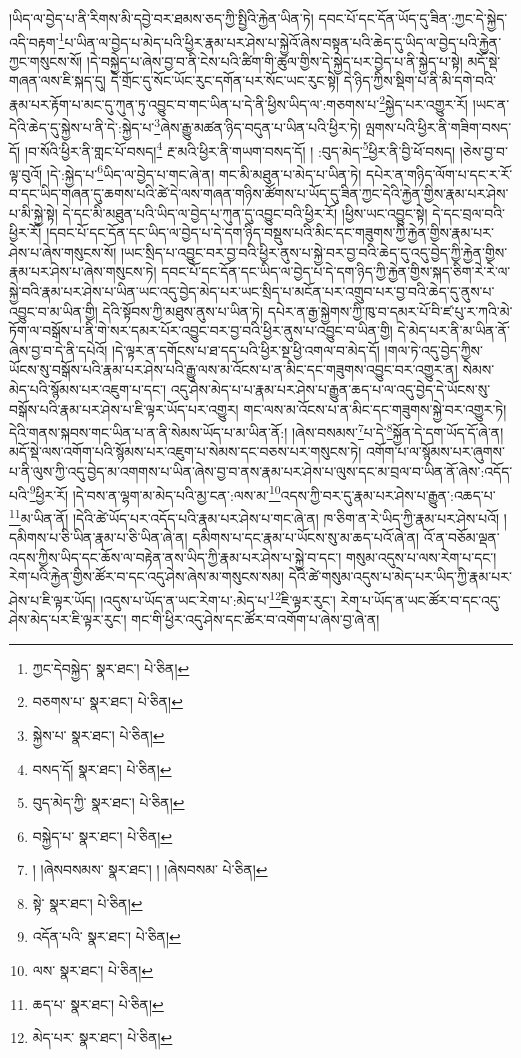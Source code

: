 །ཡིད་ལ་བྱེད་པ་ནི་རིགས་མི་དབྱེ་བར་ཐམས་ཅད་ཀྱི་སྤྱིའི་རྐྱེན་ཡིན་ཏེ། དབང་པོ་དང་དོན་ཡོད་དུ་ཟིན་:ཀྱང་དེ་སྐྱེད་འདི་བརྟག་\footnote{ཀྱང་དེབསྐྱེད་  སྣར་ཐང་།  པེ་ཅིན། }པ་ཡིན་ལ་བྱེད་པ་མེད་པའི་ཕྱིར་རྣམ་པར་ཤེས་པ་སྐྱེའོ་ཞེས་བསྟན་པའི་ཆེད་དུ་ཡིད་ལ་བྱེད་པའི་རྐྱེན་ཀྱང་གསུངས་སོ། །དེ་བསྐྱེད་པ་ཞེས་བྱ་བ་ནི་ངེས་པའི་ཚིག་གི་ཚུལ་གྱིས་དེ་སྐྱེད་པར་བྱེད་པ་ནི་སྐྱེད་པ་སྟེ། མདོ་སྡེ་གཞན་ལས་ཇི་སྐད་དུ། དེ་གྲོང་དུ་སོང་ཡོང་རུང་དགོན་པར་སོང་ཡང་རུང་སྟེ། དེ་ཉིད་ཀྱིས་སྡིག་པ་ནི་མི་དགེ་བའི་རྣམ་པར་རྟོག་པ་མང་དུ་ཀུན་ཏུ་འབྱུང་བ་གང་ཡིན་པ་དེ་ནི་ཕྱིས་ཡིད་ལ་:གཅགས་པ་\footnote{བཅགས་པ་  སྣར་ཐང་།  པེ་ཅིན། }སྐྱེད་པར་འགྱུར་རོ། །ཡང་ན་དེའི་ཆེད་དུ་སྐྱེས་པ་ནི་དེ་:སྐྱེད་པ་\footnote{སྐྱེས་པ་  སྣར་ཐང་།  པེ་ཅིན། }ཞེས་རྒྱུ་མཚན་ཉིད་བདུན་པ་ཡིན་པའི་ཕྱིར་ཏེ། ལྤགས་པའི་ཕྱིར་ནི་གཟིག་བསད་དོ། །བ་སོའི་ཕྱིར་ནི་གླང་པོ་བསད།\footnote{བསད་དོ།  སྣར་ཐང་།  པེ་ཅིན། } རྔ་མའི་ཕྱིར་ནི་གཡག་བསད་དོ། །
:བུད་མེད་\footnote{བུད་མེད་ཀྱི་  སྣར་ཐང་།  པེ་ཅིན། }ཕྱིར་ནི་བྱི་ཕོ་བསད། །ཅེས་བྱ་བ་ལྟ་བུའོ། །དེ་:སྐྱེད་པ་\footnote{བསྐྱེད་པ་  སྣར་ཐང་།  པེ་ཅིན། }ཡིད་ལ་བྱེད་པ་གང་ཞེ་ན། གང་མི་མཐུན་པ་མེད་པ་ཡིན་ཏེ། དཔེར་ན་གཉིད་ལོག་པ་དང་ར་རོ་བ་དང་ཡིད་གཞན་དུ་ཆགས་པའི་ཚེ་དེ་ལས་གཞན་གཉིས་ཚོགས་པ་ཡོད་དུ་ཟིན་ཀྱང་དེའི་རྐྱེན་གྱིས་རྣམ་པར་ཤེས་པ་མི་སྐྱེ་སྟེ། དེ་དང་མི་མཐུན་པའི་ཡིད་ལ་བྱེད་པ་ཀུན་དུ་འབྱུང་བའི་ཕྱིར་རོ། །ཕྱིས་ཡང་འབྱུང་སྟེ། དེ་དང་བྲལ་བའི་ཕྱིར་རོ། །དབང་པོ་དང་དོན་དང་ཡིད་ལ་བྱེད་པ་དེ་དག་ཉིད་བསྡུས་པའི་མིང་དང་གཟུགས་ཀྱི་རྐྱེན་གྱིས་རྣམ་པར་ཤེས་པ་ཞེས་གསུངས་སོ། །ཡང་སྲིད་པ་འབྱུང་བར་བྱ་བའི་ཕྱིར་ནུས་པ་སྐྱེ་བར་བྱ་བའི་ཆེད་དུ་འདུ་བྱེད་ཀྱི་རྐྱེན་གྱིས་རྣམ་པར་ཤེས་པ་ཞེས་གསུངས་ཏེ། དབང་པོ་དང་དོན་དང་ཡིད་ལ་བྱེད་པ་དེ་དག་ཉིད་ཀྱི་རྐྱེན་གྱིས་སྐད་ཅིག་རེ་རེ་ལ་སྐྱེ་བའི་རྣམ་པར་ཤེས་པ་ཡིན་ཡང་འདུ་བྱེད་མེད་པར་ཡང་སྲིད་པ་མངོན་པར་འགྲུབ་པར་བྱ་བའི་ཆེད་དུ་ནུས་པ་འབྱུང་བ་མ་ཡིན་གྱི། དེའི་སྟོབས་ཀྱི་མཐུས་ནུས་པ་ཡིན་ཏེ། དཔེར་ན་རྒྱ་སྐྱེགས་ཀྱི་ཁུ་བ་དམར་པོ་བི་ཛ་པུ་ར་ཀའི་མེ་ཏོག་ལ་བསྒོས་པ་ནི་གེ་སར་དམར་པོར་འབྱུང་བར་བྱ་བའི་ཕྱིར་ནུས་པ་འབྱུང་བ་ཡིན་གྱི། དེ་མེད་པར་ནི་མ་ཡིན་ནོ་ཞེས་བྱ་བ་དེ་ནི་དཔེའོ། །དེ་ལྟར་ན་དགོངས་པ་ཐ་དད་པའི་ཕྱིར་སྔ་ཕྱི་འགལ་བ་མེད་དོ། །གལ་ཏེ་འདུ་བྱེད་ཀྱིས་ཡོངས་སུ་བསྒོས་པའི་རྣམ་པར་ཤེས་པའི་རྒྱུ་ལས་མ་འོངས་པ་ན་མིང་དང་གཟུགས་འབྱུང་བར་འགྱུར་ན། སེམས་མེད་པའི་སྙོམས་པར་འཇུག་པ་དང་། འདུ་ཤེས་མེད་པ་པ་རྣམ་པར་ཤེས་པ་རྒྱུན་ཆད་པ་ལ་འདུ་བྱེད་དེ་ཡོངས་སུ་བསྒོས་པའི་རྣམ་པར་ཤེས་པ་ཇི་ལྟར་ཡོད་པར་འགྱུར། གང་ལས་མ་འོངས་པ་ན་མིང་དང་གཟུགས་སྐྱེ་བར་འགྱུར་ཏེ། དེའི་གནས་སྐབས་གང་ཡིན་པ་ན་ནི་སེམས་ཡོད་པ་མ་ཡིན་ནོ:། །ཞེས་བསམས་\footnote{། །ཞེསབསམས་  སྣར་ཐང་། ། །ཞེསབསམ་  པེ་ཅིན། }པ་དེ་\footnote{སྟེ་  སྣར་ཐང་།  པེ་ཅིན། }སྐྱོན་དེ་དག་ཡོད་དོ་ཞེ་ན། མདོ་སྡེ་ལས་འགོག་པའི་སྙོམས་པར་འཇུག་པ་སེམས་དང་བཅས་པར་གསུངས་ཏེ། འགོག་པ་ལ་སྙོམས་པར་ཞུགས་པ་ནི་ལུས་ཀྱི་འདུ་བྱེད་མ་འགགས་པ་ཡིན་ཞེས་བྱ་བ་ནས་རྣམ་པར་ཤེས་པ་ལུས་དང་མ་བྲལ་བ་ཡིན་ནོ་ཞེས་:འདོད་པའི་\footnote{འདོན་པའི་  སྣར་ཐང་།  པེ་ཅིན། }ཕྱིར་རོ། །དེ་བས་ན་ལྷག་མ་མེད་པའི་མྱ་ངན་:ལས་མ་\footnote{ལས་  སྣར་ཐང་།  པེ་ཅིན། }འདས་ཀྱི་བར་དུ་རྣམ་པར་ཤེས་པ་རྒྱུན་:འཆད་པ་\footnote{ཆད་པ་  སྣར་ཐང་།  པེ་ཅིན། }མ་ཡིན་ནོ། །དེའི་ཚེ་ཡོད་པར་འདོད་པའི་རྣམ་པར་ཤེས་པ་གང་ཞེ་ན། ཁ་ཅིག་ན་རེ་ཡིད་ཀྱི་རྣམ་པར་ཤེས་པའོ། །དམིགས་པ་ཅི་ཡིན་རྣམ་པ་ཅི་ཡིན་ཞེ་ན། དམིགས་པ་དང་རྣམ་པ་ཡོངས་སུ་མ་ཆད་པའོ་ཞེ་ན། འོ་ན་བཅོམ་ལྡན་འདས་ཀྱིས་ཡིད་དང་ཆོས་ལ་བརྟེན་ནས་ཡིད་ཀྱི་རྣམ་པར་ཤེས་པ་སྐྱེ་བ་དང་། གསུམ་འདུས་པ་ལས་རེག་པ་དང་། རེག་པའི་རྐྱེན་གྱིས་ཚོར་བ་དང་འདུ་ཤེས་ཞེས་མ་གསུངས་སམ། དེའི་ཚེ་གསུམ་འདུས་པ་མེད་པར་ཡིད་ཀྱི་རྣམ་པར་ཤེས་པ་ཇི་ལྟར་ཡོད། །འདུས་པ་ཡོད་ན་ཡང་རེག་པ་:མེད་པ་\footnote{མེད་པར་  སྣར་ཐང་།  པེ་ཅིན། }ཇི་ལྟར་རུང་། རེག་པ་ཡོད་ན་ཡང་ཚོར་བ་དང་འདུ་ཤེས་མེད་པར་ཇི་ལྟར་རུང་། གང་གི་ཕྱིར་འདུ་ཤེས་དང་ཚོར་བ་འགོག་པ་ཞེས་བྱ་ཞེ་ན། 